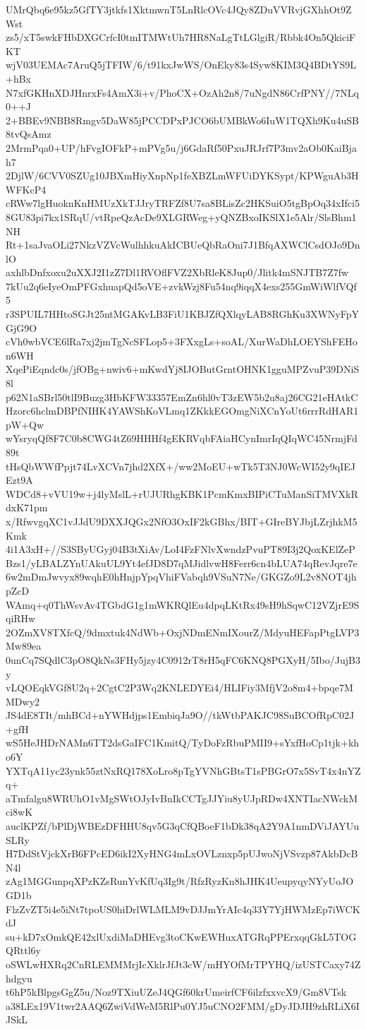UMrQbq6e95kz5GfTY3jtkfs1XktmwnT5LnRlcOVc4JQy8ZDuVVRvjGXhhOt9ZWst
zs5/xT5swkFHbDXGCrfcI0tmITMWtUh7HR8NaLgTtLGlgiR/Rbbk4On5QkiciFKT
wjV03UEMAc7AruQ5jTFIW/6/t91kxJwWS/OnEky83s4Syw8KIM3Q4BDtYS9L+hBx
N7xfGKHnXDJHnrxFs4AmX3i+v/PhoCX+OzAh2n8/7uNgdN86CrfPNY//7NLq0++J
2+BBEv9NBB8Rmgv5DaW85jPCCDPxPJCO6bUMBkWo6IuW1TQXh9Ku4uSB8tvQsAmz
2MrmPqa0+UP/hFvgIOFkP+mPVg5u/j6GdaRf50PxuJRJrf7P3mv2aOb0KaiBjah7
2DjlW/6CVV0SZUg10JBXmHiyXnpNp1feXBZLmWFUiDYKSypt/KPWguAb3HWFKcP4
cRWw7lgHuoknKnHMUzXkTJJryTRFZf8U7sa8BLisZc2HKSuiO5tgBpOq34xIfci5
8GU83pi7kx1SRqU/vtRpeQzAcDe9XLGRWeg+yQNZBxoIKSlX1e5Alr/SlsBhm1NH
Rt+1saJvaOLi27NkzVZVcWulhhkuAkICBUeQbRaOni7J1BfqAXWClCsdOJo9DnlO
axhlbDnfxoxu2uXXJ2I1zZ7Dl1RVOflFVZ2XbRleK8Jup0/Jlitk4mSNJTB7Z7fw
7kUu2q6eIyeOmPFGxhuapQd5oVE+zvkWzj8Fu54nq9iqqX4exs255GmWiWlfVQf5
r3SPUIL7HHtoSGJt25ntMGAKvLB3FiU1KBJZfQXlqyLAB8RGhKu3XWNyFpYGjG9O
cVh0wbVCE6lRa7xj2jmTgNcSFLop5+3FXxgLs+soAL/XurWaDhLOEYShFEHon6WH
XqePiEqndc0s/jfOBg+nwiv6+mKwdYj8IJOButGrntOHNK1gguMPZvuP39DNiS8l
p62N1aSBrl50tlI9Buzg3HbKFW33357EmZn6hl0vT3zEW5b2u8aj26CG21eHAtkC
Hzorc6hclmDBPfNIHK4YAWShKoVLmq1ZKkkEGOmgNiXCnYoUt6rrrRdHAR1pW+Qw
wYsryqQf8F7C0b8CWG4tZ69HHHf4gEKRVqbFAiaHCynImrIqQIqWC45NrmjFd89t
tHsQbWWfPpjt74LvXCVn7jhd2XfX+/ww2MoEU+wTk5T3NJ0WcWI52y9qIEJEzt9A
WDCd8+vVU19w+j4lyMslL+rUJURhgKBK1PcmKmxBIPiCTuManSiTMVXkRdxK71pm
x/RfwvgqXC1vJJdU9DXXJQGx2NfO3OxIF2kGBhx/BIT+GIreBYJbjLZrjhkM5Kmk
4i1A3xH+//S3SByUGyj04B3tXiAv/LoI4FzFNlvXwndzPvuPT89I3j2QoxKElZeP
Bzs1/yLBALZYnUAkuUL9Yt4efJD8D7qMJidlvwH8Ferr6cn4bLUA74qRevJqre7e
6w2mDmJwvyx89wqhE0hHnjpYpqVhiFVabqh9VSuN7Ne/GKGZo9L2v8NOT4jhpZcD
WAmq+q0ThWsvAv4TGbdG1g1mWKRQlEu4dpqLKtRx49sH9hSqwC12VZjrE9SqiRHw
2OZmXV8TXfcQ/9dmxtuk4NdWb+OxjNDmENmIXourZ/MdyuHEFapPtgLVP3Mw89ea
0unCq7SQdlC3pO8QkNs3FHy5jzy4C0912rT8rH5qFC6KNQ8PGXyH/5Ibo/JujB3y
vLQOEqkVGf8U2q+2CgtC2P3Wq2KNLEDYEi4/HLIFiy3MfjV2o8m4+bpqe7MMDwy2
JS4dE8TIt/mhBCd+nYWHdjps1EmbiqJa9O//tkWtbPAKJC98SuBCOfRpC02J+gfH
wS5HeJHDrNAMn6TT2dsGaIFC1KmitQ/TyDoFzRbuPMII9+sYxfHoCp1tjk+kho6Y
YXTqA11yc23ynk55ztNxRQ178XoLro8pTgYVNhGBtsT1sPBGrO7x5SvT4x4nYZq+
aTmfalgu8WRUhO1vMgSWtOJyIvBnIkCCTgJJYiu8yUJpRDw4XNTIacNWckMci8wK
auclKPZf/bPlDjWBEzDFHHU8qv5G3qCfQBoeF1bDk38qA2Y9A1nmDViJAYUuSLRy
H7DdStVjckXrB6FPcED6ikI2XyHNG4mLxOVLznxp5pUJwoNjVSvzp87AkbDcBN4l
zAg1MGGunpqXPzKZsRunYvKfUq3Ig9t/RfzRyzKn8hJHK4UeupyqyNYyUoJOGD1b
FlzZvZT5i4e5iNt7tpoUS0hiDrlWLMLM9vDJJmYrAIc4q33Y7YjHWMzEp7iWCKdJ
su+kD7xOmkQE42xlUxdiMaDHEvg3toCKwEWHuxATGRqPPErxqqGkL5TOGQRttl6y
oSWLwHXRq2CnRLEMMMrjIcXklrJfJt3cW/mHYOfMrTPYHQ/izUSTCaxy74Zhdgyu
t6hP5kBlpgsGgZ5u/Noz9TXiuUZeJ4QGf60krUmeirfCF6ilzfxxvcX9/Gm8VTsk
a38LEx19V1twr2AAQ6ZwiVdWeM5RlPu0YJ5uCNO2FMM/gDyJDJH9zhRLiX6IJSkL
